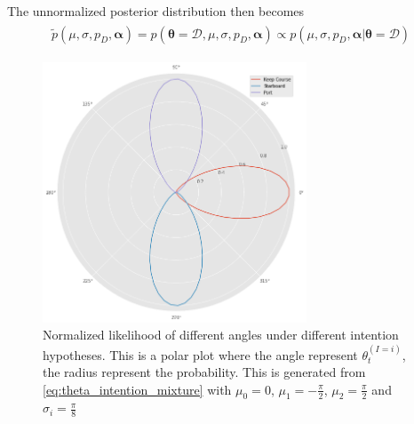 The unnormalized posterior distribution then becomes
\begin{align}\label{eq:example_unnormalized_posterior}
\begin{split}
    \tilde{p}(\mu, \sigma, p_D, \boldsymbol{\alpha}) =  p(\boldsymbol{\theta} = \mathcal{D}, \mu, \sigma, p_D, \boldsymbol{\alpha}) \propto p(\mu, \sigma, p_D, \boldsymbol{\alpha} | \boldsymbol{\theta}= \mathcal{D})
\end{split}
\end{align}


\begin{figure}
    \centering
    \includegraphics[width=0.7\textwidth]{figures/intention_angle.png}
    \caption{Normalized likelihood of different angles under different intention hypotheses. This is a polar plot where the angle represent $\theta_t^{(I=i)}$, the radius represent the probability. This is generated from \cref{eq:theta_intention_mixture} with $\mu_0=0$, $\mu_1 = -\frac{\pi}{2}$, $\mu_2=\frac{\pi}{2}$ and $\sigma_i=\frac{\pi}{8}$}
    \label{fig:intention_angle}
\end{figure}

